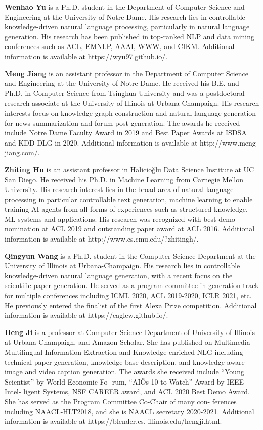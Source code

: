 \begin{bio}
  {\bfseries Wenhao Yu} is a Ph.D. student in the Department of Computer Science and Engineering at the University of Notre Dame. His research lies in controllable knowledge-driven natural language processing, particularly in natural language generation. His research has been published in top-ranked NLP and data mining conferences such as ACL, EMNLP, AAAI, WWW, and CIKM. Additional information is available at https://wyu97.github.io/.

  {\bfseries Meng Jiang} is an assistant professor in the Department of Computer Science and Engineering at the University of Notre Dame. He received his B.E. and Ph.D. in Computer Science from Tsinghua University and was a postdoctoral research associate at the University of Illinois at Urbana-Champaign. His research interests focus on knowledge graph
construction and natural language generation for news summarization and forum post generation. The awards he received include Notre Dame Faculty Award in 2019 and Best Paper Awards at ISDSA and KDD-DLG in 2020. Additional information is available at http://www.meng-jiang.com/.

  {\bfseries Zhiting Hu} is an assistant professor in Halicio\v{g}lu Data Science Institute at UC San Diego. He received his Ph.D. in Machine Learning from Carnegie Mellon University. His research interest lies in the broad area of natural language processing in particular controllable text generation, machine learning to enable training AI agents from all forms of experiences such as structured knowledge, ML systems and applications. His research was recognized with best demo nomination at ACL 2019 and outstanding paper award at ACL 2016. Additional information is available at http://www.cs.cmu.edu/?zhitingh/.

  {\bfseries Qingyun Wang} is a Ph.D. student in the Computer Science Department at the University of Illinois at Urbana-Champaign. His research lies in controllable knowledge-driven natural language generation, with a recent focus on the scientific paper generation. He served as a program committee in generation track for multiple conferences including ICML 2020, ACL 2019-2020, ICLR 2021, etc. He previously entered the finalist of the first Alexa Prize competition. Additional information is available at https://eaglew.github.io/.

  {\bfseries Heng Ji} is a professor at Computer Science Department of University of Illinois at Urbana-Champaign, and Amazon Scholar. She has published on Multimedia Multilingual Information Extraction and Knowledge-enriched NLG including technical paper generation, knowledge base description, and knowledge-aware image and video caption generation. The awards she received include ``Young Scientist''  by World Economic Fo- rum, ``AIÕs 10 to Watch'' Award by IEEE Intel- ligent Systems, NSF CAREER award, and ACL 2020 Best Demo Award. She has served as the Program Committee Co-Chair of many con- ferences including NAACL-HLT2018, and she is NAACL secretary 2020-2021. Additional information is available at https://blender.cs. illinois.edu/hengji.html.


\end{bio}
